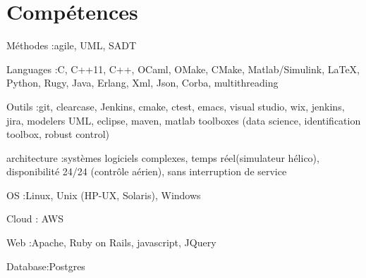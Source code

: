 \section{Compétences}

\begin{itemize}

\myitem
{Méthodes :}{agile, UML, SADT}

\myitem
{Languages :}{C, C++11, C++, OCaml, OMake, CMake, Matlab/Simulink, LaTeX, Python, Rugy, Java, Erlang, Xml, Json, Corba, multithreading}

\myitem
{Outils :}{git, clearcase, Jenkins, cmake, ctest, emacs, visual studio, wix, jenkins, jira, modelers UML, eclipse, maven, matlab toolboxes (data science, identification toolbox, robust control)}

\myitem
{architecture :}{systèmes logiciels complexes, temps réel(simulateur hélico), disponibilité 24/24 (contrôle aérien), sans interruption de service}

\myitem
{OS :}{Linux, Unix (HP-UX, Solaris), Windows}

\myitem
{Cloud} : {AWS}

\myitem 
{Web :}{Apache, Ruby on Rails, javascript, JQuery}

\myitem 
{Database:}{Postgres}

\end{itemize}

